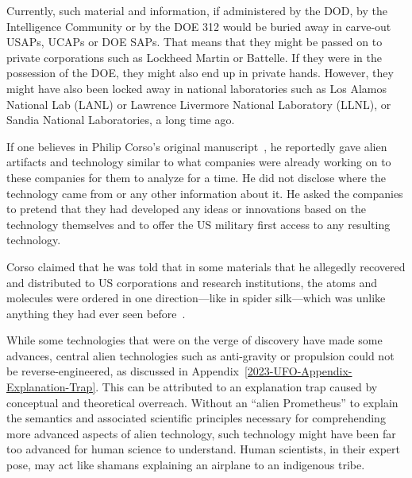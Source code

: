 Currently, such material and information, if administered by the DOD, by the Intelligence Community or by the DOE
312 would be buried away in carve-out USAPs, UCAPs or DOE SAPs. That means that they might be passed on to private corporations such as Lockheed Martin or Battelle. If they were in the possession of the DOE, they might also end up in private hands. However, they might have also been locked away in national laboratories such as Los Alamos National Lab (LANL) or Lawrence Livermore National Laboratory (LLNL), or Sandia National Laboratories, a long time ago.

If one believes in Philip Corso's original manuscript~\cite{Corso}, he reportedly gave alien artifacts and technology similar to what companies were already working on to these companies for them to analyze for a time. He did not disclose where the technology came from or any other information about it. He asked the companies to pretend that they had developed any ideas or innovations based on the technology themselves and to offer the US military first access to any resulting technology.





\label{2023-UFO-part-Perception-crash-retreivals-wkoam}

Corso claimed that he was told that in some materials that he allegedly recovered and distributed to US corporations and research institutions, the atoms and molecules were ordered in one direction---like in spider silk---which was unlike anything they had ever seen before~\cite{Corso1998Jun}.

While some technologies that were on the verge of discovery have made some advances, central alien technologies such as anti-gravity or
propulsion could not be reverse-engineered, as discussed in Appendix~\ref{2023-UFO-Appendix-Explanation-Trap}.
This can be attributed to an explanation trap caused by conceptual and theoretical overreach. Without an ``alien Prometheus'' to explain the semantics and associated scientific principles necessary for comprehending more advanced aspects of alien technology, such technology might have been far too advanced for human science to understand.
Human scientists, in their expert pose, may act like shamans explaining an airplane to an indigenous tribe.

